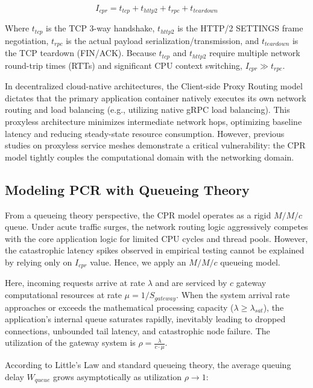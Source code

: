 \documentclass{ieeeaccess}
\begin{document}
	\begin{equation}
		I_{cpr} = t_{tcp} + t_{http2} + t_{rpc} + t_{teardown}
	\end{equation}
	
	Where $t_{tcp}$ is the TCP 3-way handshake, $t_{http2}$ is the HTTP/2 SETTINGS frame negotiation, $t_{rpc}$ is the actual payload serialization/transmission, and $t_{teardown}$ is the TCP teardown (FIN/ACK). Because $t_{tcp}$ and $t_{http2}$ require multiple network round-trip times (RTTs) and significant CPU context switching, $I_{cpr} \gg t_{rpc}$.
	
	In decentralized cloud-native architectures, the Client-side Proxy Routing model dictates that the primary application container natively executes its own network routing and load balancing (e.g., utilizing native gRPC load balancing). This proxyless architecture minimizes intermediate network hops, optimizing baseline latency and reducing steady-state resource consumption. However, previous studies on proxyless service meshes demonstrate a critical vulnerability: the CPR model tightly couples the computational domain with the networking domain.
	
	
	\subsection{Modeling PCR with Queueing Theory}
	
	
	From a queueing theory perspective, the CPR model operates as a rigid $M/M/c$ queue. Under acute traffic surges, the network routing logic aggressively competes with the core application logic for limited CPU cycles and thread pools.  However, the catastrophic latency spikes observed in empirical testing cannot be explained by relying only on $I_{cpr}$ value.  Hence, we apply an $M/M/c$ queueing model.
	
	Here, incoming requests arrive at rate $\lambda$ and are serviced by $c$ gateway computational resources at rate $\mu = 1/S_{gateway}$.  When the system arrival rate approaches or exceeds the mathematical processing capacity ($\lambda \ge  \lambda_{sat}$), the application’s internal queue saturates rapidly, inevitably leading to dropped connections, unbounded tail latency, and catastrophic node failure.  The utilization of the gateway system is $\rho = \frac{\lambda}{c \cdot \mu}$. 
	
	According to Little's Law \cite{little2011or} and standard queueing theory, the average queuing delay $W_{queue}$ grows asymptotically as utilization $\rho \to 1$:
	
\end{document}
